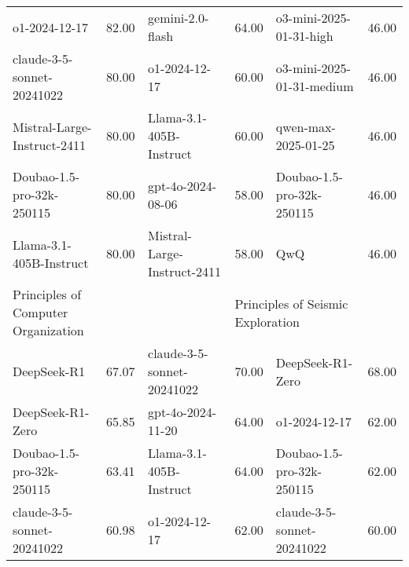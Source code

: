 {\begin{longtable}{p{4.2cm}>{\centering\arraybackslash} p{0.8cm}|p{4.2cm} >{\centering\arraybackslash} p{0.8cm}|p{4.2cm} >{\centering\arraybackslash} p{0.8cm}}
\hline
\cellcolor{blue!5} o1-2024-12-17 & \cellcolor{blue!2}82.00 & \cellcolor{purple!5} gemini-2.0-flash & \cellcolor{purple!2} 64.00 & \cellcolor{green!5} o3-mini-2025-01-31-high & \cellcolor{green!2} 46.00\\
\cellcolor{blue!5} claude-3-5-sonnet-20241022 & \cellcolor{blue!2}80.00 & \cellcolor{purple!5} o1-2024-12-17 & \cellcolor{purple!2} 60.00 & \cellcolor{green!5} o3-mini-2025-01-31-medium & \cellcolor{green!2} 46.00\\
\cellcolor{blue!5} Mistral-Large-Instruct-2411 & \cellcolor{blue!2}80.00 & \cellcolor{purple!5} Llama-3.1-405B-Instruct & \cellcolor{purple!2} 60.00 & \cellcolor{green!5} qwen-max-2025-01-25 & \cellcolor{green!2} 46.00\\
\cellcolor{blue!5} Doubao-1.5-pro-32k-250115 & \cellcolor{blue!2}80.00 & \cellcolor{purple!5} gpt-4o-2024-08-06 & \cellcolor{purple!2} 58.00 & \cellcolor{green!5} Doubao-1.5-pro-32k-250115 & \cellcolor{green!2} 46.00\\
\cellcolor{blue!5} Llama-3.1-405B-Instruct & \cellcolor{blue!2}80.00 & \cellcolor{purple!5} Mistral-Large-Instruct-2411 & \cellcolor{purple!2} 58.00 & \cellcolor{green!5} QwQ & \cellcolor{green!2} 46.00\\
\hline
\multicolumn{2}{p{5.15cm}|}{\cellcolor{blue!10} \centering Principles of Computer Organization} & \multicolumn{2}{p{5.15cm}|}{\cellcolor{purple!10} \centering Linguistics and Applied Linguistics} & \multicolumn{2}{p{5.15cm}}{\cellcolor{green!10} \centering Principles of Seismic Exploration}\\
\hline
\cellcolor{blue!5} DeepSeek-R1 & \cellcolor{blue!2}67.07 & \cellcolor{purple!5} claude-3-5-sonnet-20241022 & \cellcolor{purple!2} 70.00 & \cellcolor{green!5} DeepSeek-R1-Zero & \cellcolor{green!2} 68.00\\
\cellcolor{blue!5} DeepSeek-R1-Zero & \cellcolor{blue!2}65.85 & \cellcolor{purple!5} gpt-4o-2024-11-20 & \cellcolor{purple!2} 64.00 & \cellcolor{green!5} o1-2024-12-17 & \cellcolor{green!2} 62.00\\
\cellcolor{blue!5} Doubao-1.5-pro-32k-250115 & \cellcolor{blue!2}63.41 & \cellcolor{purple!5} Llama-3.1-405B-Instruct & \cellcolor{purple!2} 64.00 & \cellcolor{green!5} Doubao-1.5-pro-32k-250115 & \cellcolor{green!2} 62.00\\
\cellcolor{blue!5} claude-3-5-sonnet-20241022 & \cellcolor{blue!2}60.98 & \cellcolor{purple!5} o1-2024-12-17 & \cellcolor{purple!2} 62.00 & \cellcolor{green!5} claude-3-5-sonnet-20241022 & \cellcolor{green!2} 60.00\\

\end{longtable}}
